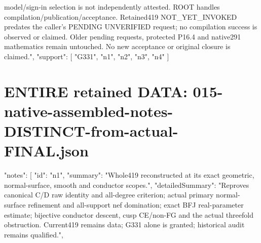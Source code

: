\documentclass[11pt]{article}
\begin{document}
\begin{Full422Data}
{model/sign-in selection is not independently attested. ROOT handles compilation/publication/acceptance. Retained419 NOT_YET_INVOKED predates the caller's PENDING UNVERIFIED request; no compilation success is observed or claimed. Older pending requests, protected P16.4 and native291 mathematics remain untouched. No new acceptance or original closure is claimed.",
  "support": [
    "G331",
    "n1",
    "n2",
    "n3",
    "n4"
  ]
}

\end{Full422Data}
\section{ENTIRE retained DATA: 015-native-assembled-notes-DISTINCT-from-actual-FINAL.json}
\begin{Full422Data}
{
  "notes": [
    {
      "id": "n1",
      "summary": "Whole419 reconstructed at its exact geometric, normal-surface, smooth and conductor scopes.",
      "detailedSummary": "Reproves canonical C/D raw identity and all-degree criterion; actual primary normal-surface refinement and all-support nef domination; exact BFJ real-parameter estimate; bijective conductor descent, cusp CE/non-FG and the actual threefold obstruction. Current419 remains data; G331 alone is granted; historical audit remains qualified.",
}}
\end{Full422Data}
\end{document}
